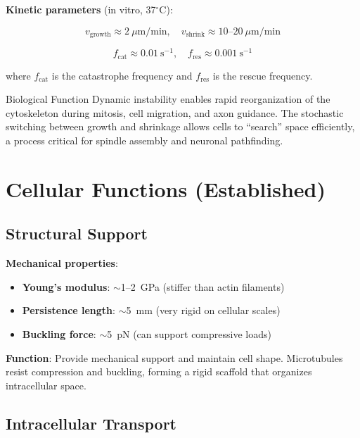 \textbf{Kinetic parameters} (in vitro, 37$^\circ$C):

\begin{equation}
v_{\text{growth}} \approx 2~\mu\text{m/min}, \quad v_{\text{shrink}} \approx 10\text{--}20~\mu\text{m/min}
\label{eq:growth-shrink-rates}
\end{equation}

\begin{equation}
f_{\text{cat}} \approx 0.01~\text{s}^{-1}, \quad f_{\text{res}} \approx 0.001~\text{s}^{-1}
\label{eq:catastrophe-rescue-freq}
\end{equation}

where $f_{\text{cat}}$ is the catastrophe frequency and $f_{\text{res}}$ is the rescue frequency.

\begin{calloutbox}{Biological Function}
Dynamic instability enables rapid reorganization of the cytoskeleton during mitosis, cell migration, and axon guidance. The stochastic switching between growth and shrinkage allows cells to ``search'' space efficiently, a process critical for spindle assembly and neuronal pathfinding.
\end{calloutbox}

\section{Cellular Functions (Established)}
\label{sec:cellular-functions}

\subsection{Structural Support}
\label{subsec:structural-support}

\textbf{Mechanical properties}:
\begin{itemize}
\item \textbf{Young's modulus}: $\sim$1--2~GPa (stiffer than actin filaments)
\item \textbf{Persistence length}: $\sim$5~mm (very rigid on cellular scales)
\item \textbf{Buckling force}: $\sim$5~pN (can support compressive loads)
\end{itemize}

\textbf{Function}: Provide mechanical support and maintain cell shape. Microtubules resist compression and buckling, forming a rigid scaffold that organizes intracellular space.

\subsection{Intracellular Transport}
\label{subsec:intracellular-transport}

